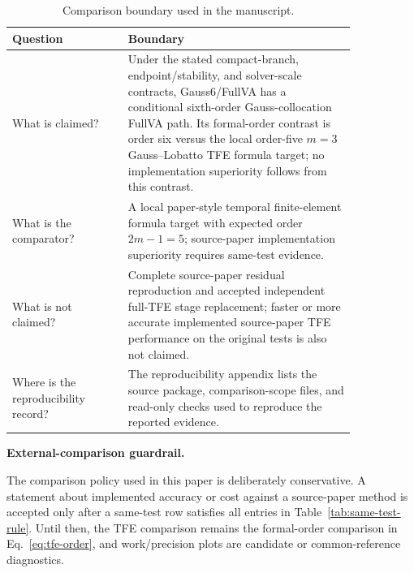 \documentclass[preprint,12pt]{elsarticle}
\newcommand{\method}{Gauss6\slash FullVA}
\newcommand{\tfe}{TFE}
\begin{document}
\begin{table}[htbp]
\centering
\caption{Comparison boundary used in the manuscript.}
\label{tab:claim-boundary}
\begin{tabular}{P{0.29\linewidth}P{0.55\linewidth}}
\toprule
Question & Boundary \\
\midrule
What is claimed? &
Under the stated compact-branch, endpoint/stability, and solver-scale
contracts, \method{} has a conditional sixth-order Gauss-collocation FullVA
path. Its
formal-order contrast is order six versus the local order-five $m=3$
Gauss--Lobatto \tfe{} formula target; no implementation superiority follows
from this contrast. \\
What is the comparator? &
A local paper-style temporal finite-element formula target with expected order
$2m-1=5$; source-paper implementation superiority requires same-test evidence. \\
What is not claimed? &
Complete source-paper residual reproduction and accepted independent
full-\tfe{} stage replacement; faster or more accurate implemented
source-paper \tfe{} performance on the original tests is also not claimed. \\
Where is the reproducibility record? &
The reproducibility appendix lists the source package, comparison-scope files,
and read-only checks used to reproduce the reported evidence. \\
\bottomrule
\end{tabular}
\end{table}

\noindent\textbf{External-comparison guardrail.}

The comparison policy used in this paper is deliberately conservative. A
statement about implemented accuracy or cost against a source-paper method is
accepted only after a same-test row satisfies all entries in
Table~\ref{tab:same-test-rule}. Until then, the \tfe{} comparison remains the
formal-order comparison in Eq.~\eqref{eq:tfe-order}, and work/precision plots
are candidate or common-reference diagnostics.
\end{document}

